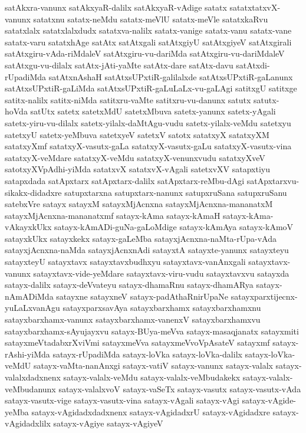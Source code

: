 {satAkxra-vanunx
satAkxyaR-dalilx
satAkxyaR-vAdige
satatx
satatxtatxvX-vanunx
satatxnu
satatx-neMdu
satatx-meVlU
satatx-meVle
satatxkaRvu
satatxlalx
satatxlalxdudx
satatxva-nalilx
satatx-vanige
satatx-vanu
satatx-vane
satatx-varu
satatxhAge
satAtx
satAtxgali
satAtxgiyU
satAtxgiyeV
satAtxgirali
satAtxgiru-vAda-riMdaleV
satAtxgiru-vu-dariMda
satAtxgiru-vu-dariMdaleV
satAtxgu-vu-dilalx
satAtx-jAti-yaMte
satAtx-dare
satAtx-davu
satAtxdi-rUpadiMda
satAtxnAshaH
satAtxsUPxtiR-galilalxde
satAtxsUPxtiR-gaLanunx
satAtxsUPxtiR-gaLiMda
satAtxsUPxtiR-gaLuLaLx-vu-gaLAgi
satitxgU
satitxge
satitx-nalilx
satitx-niMda
satitxru-vaMte
satitxru-vu-danunx
satutx
satutx-hoVda
satUtx
satetx
satetxMdU
satetxMbuva
satetx-yanunx
satetx-yAgali
satetx-yiru-vu-dilalx
satetx-yilalx-daMtAgu-vudu
satetx-yilalx-veMdu
satetxyu
satetxyU
satetx-yeMbuva
satetxyeV
satetxV
satotx
satatxyX
satatxyXM
satatxyXmf
satatxyX-vasutx-gaLa
satatxyX-vasutx-gaLu
satatxyX-vasutx-vina
satatxyX-veMdare
satatxyX-veMdu
satatxyX-venunxvudu
satatxyXveV
satotxyXVpAdhi-yiMda
satatxvX
satatxvX-vAgali
satetxvXV
satapxtiyu
satapxdada
satApxtarx
satApxtarx-dalilx
satApxtarx-reMbu-dAgi
satApxtarxvu-sikakx-didadxre
satupxtarxna
satupxtarx-nanunx
satupxruSana
satupxruSanu
satebxVre
satayx
satayxM
satayxMjAcnxna
satayxMjAcnxna-mananatxM
satayxMjAcnxna-mananatxmf
satayx-kAma
satayx-kAmaH
satayx-kAma-vAkayxkUkx
satayx-kAmADi-guNa-gaLoMdige
satayx-kAmAya
satayx-kAmoV
satayxkUkx
satayxkekx
satayx-gaLeMba
satayxjAcnxna-naMta-rUpa-vAda
satayxjAcnxna-naMda
satayxjAcnxnAdi
satayxtA
satayxte-yanunx
satayxteyu
satayxteyU
satayxtavx
satayxtavxbudhxyu
satayxtavx-vanAnxgali
satayxtavx-vanunx
satayxtavx-vide-yeMdare
satayxtavx-viru-vudu
satayxtavxvu
satayxda
satayx-dalilx
satayx-deVvateyu
satayx-dhamaRnu
satayx-dhamARya
satayx-nAmADiMda
satayxne
satayxneV
satayx-padAthaRnirUpaNe
satayxparxtijecnx-yuLaLxvanAgu
satayxparxsavAya
satayxbarxhamx
satayxbarxhamxnu
satayxbarxhamx-vanunx
satayxbarxhamx-vanenxV
satayxbarxhamxvu
satayxbarxhamx-sAyujayxvu
satayx-BUya-meVva
satayx-masaqjanatx
satayxmiti
satayxmeVtadabxrXviVmi
satayxmeVva
satayxmeVvoVpAsateV
satayxmf
satayx-rAshi-yiMda
satayx-rUpadiMda
satayx-loVka
satayx-loVka-dalilx
satayx-loVka-veMdU
satayx-vaMta-nanAnxgi
satayx-vatiV
satayx-vanunx
satayx-valalx
satayx-valalxdadxnenx
satayx-valalx-veMdu
satayx-valalx-veMbudakekx
satayx-valalx-veMbudanunx
satayx-valalxvoV
satayx-vaSeTx
satayx-vasutx
satayx-vasutx-vAda
satayx-vasutx-vige
satayx-vasutx-vina
satayx-vAgali
satayx-vAgi
satayx-vAgide-yeMba
satayx-vAgidadxdadxnenx
satayx-vAgidadxrU
satayx-vAgidadxre
satayx-vAgidadxlilx
satayx-vAgiye
satayx-vAgiyeV
}
